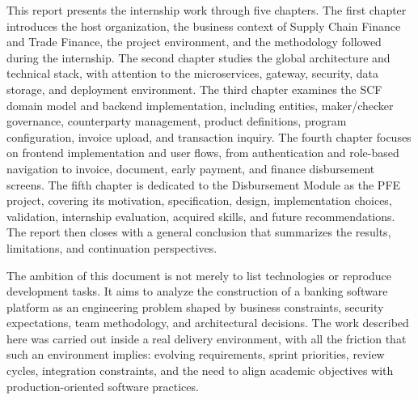 This report presents the internship work through five chapters. The first chapter introduces the host organization, the business context of Supply Chain Finance and Trade Finance, the project environment, and the methodology followed during the internship. The second chapter studies the global architecture and technical stack, with attention to the microservices, gateway, security, data storage, and deployment environment. The third chapter examines the SCF domain model and backend implementation, including entities, maker/checker governance, counterparty management, product definitions, program configuration, invoice upload, and transaction inquiry. The fourth chapter focuses on frontend implementation and user flows, from authentication and role-based navigation to invoice, document, early payment, and finance disbursement screens. The fifth chapter is dedicated to the Disbursement Module as the PFE project, covering its motivation, specification, design, implementation choices, validation, internship evaluation, acquired skills, and future recommendations. The report then closes with a general conclusion that summarizes the results, limitations, and continuation perspectives.

The ambition of this document is not merely to list technologies or reproduce development tasks. It aims to analyze the construction of a banking software platform as an engineering problem shaped by business constraints, security expectations, team methodology, and architectural decisions. The work described here was carried out inside a real delivery environment, with all the friction that such an environment implies: evolving requirements, sprint priorities, review cycles, integration constraints, and the need to align academic objectives with production-oriented software practices.
